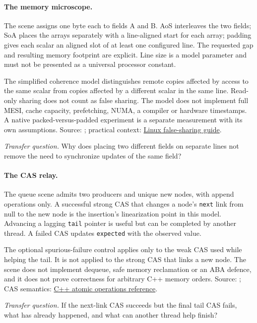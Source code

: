 {  \paragraph{The memory microscope.}
  \par The scene assigns one byte each to fields A and B. AoS interleaves the two fields; SoA places the arrays separately with a line-aligned start for each array; padding gives each scalar an aligned slot of at least one configured line. The requested gap and resulting memory footprint are explicit. Line size is a model parameter and must not be presented as a universal processor constant.
  \par The simplified coherence model distinguishes remote copies affected by access to the same scalar from copies affected by a different scalar in the same line. Read-only sharing does not count as false sharing. The model does not implement full MESI, cache capacity, prefetching, NUMA, a compiler or hardware timestamps. A native packed-versus-padded experiment is a separate measurement with its own assumptions. Source: ; practical context: \href{https://www.kernel.org/doc/html/latest/kernel-hacking/false-sharing.html}{Linux false-sharing guide}.
  \par\textit{Transfer question.} Why does placing two different fields on separate lines not remove the need to synchronize updates of the same field?

  \paragraph{The CAS relay.}
  \par The queue scene admits two producers and unique new nodes, with append operations only. A successful strong CAS that changes a node's \texttt{next} link from null to the new node is the insertion's linearization point in this model. Advancing a lagging \texttt{tail} pointer is useful but can be completed by another thread. A failed CAS updates \texttt{expected} with the observed value.
  \par The optional spurious-failure control applies only to the weak CAS used while helping the tail. It is not applied to the strong CAS that links a new node. The scene does not implement dequeue, safe memory reclamation or an ABA defence, and it does not prove correctness for arbitrary C++ memory orders. Source: ; CAS semantics: \href{https://eel.is/c++draft/atomics.types.generic}{C++ atomic operations reference}.
  \par\textit{Transfer question.} If the next-link CAS succeeds but the final tail CAS fails, what has already happened, and what can another thread help finish?

}
